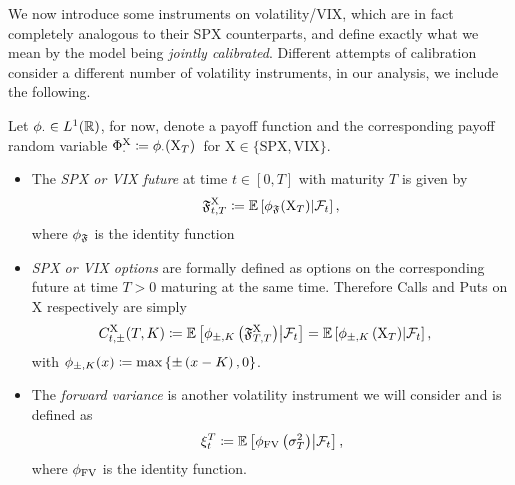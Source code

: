 We now introduce some instruments on volatility/VIX, which are in fact completely analogous to their SPX counterparts, and define exactly what we mean by the model being \textit{jointly calibrated}. Different attempts of calibration consider a different number of volatility instruments, in our analysis, we include the following. 

Let $\phi_\cdot\in L^1(\mathbb{R})$, for now, denote a payoff function and the corresponding payoff random variable $\Phi_{\cdot}^{\mathrm{X}}\coloneqq \phi_{\cdot}(\mathrm{X}_T)\,$ for $\mathrm{X}\in\{\text{SPX}, \text{VIX}\}$. 

\begin{itemize}
\item The \textit{SPX or VIX future} at time $t\in[0,T]$ with maturity $T$ is given by
\begin{equation*}
\mathfrak{F}_{t, T}^{\mathrm{X}}\coloneqq\mathbb{E}\left[\phi_{\mathfrak{F}}(\mathrm{X}_{T}) \middle\vert \mathcal{F}_{t}\right],
\end{equation*}
where $\phi_{\mathfrak{F}}$ is the identity function
\item \textit{SPX or VIX options} are formally defined as options on the corresponding future at time $T>0$ maturing at the same time. Therefore Calls and Puts on $\mathrm{X}$ respectively are simply
\begin{align*}
C_{t,\pm}^{\mathrm{X}}(T,K) &\coloneqq \mathbb{E}\left[\phi_{\pm, K}\left(\mathfrak{F}^{\mathrm{X}}_{T,T}\right) \middle\vert \mathcal{F}_{t}\right] = \mathbb{E}\left[\phi_{\pm, K}\left(\mathrm{X}_{T}\right)\middle\vert \mathcal{F}_{t}\right],
\end{align*}
with $\phi_{\pm, K}(x) \coloneqq \max \left\{ \pm \left(x - K\right), 0 \right\}$.
\item The \textit{forward variance} is another volatility instrument we will consider and is defined as
\begin{equation*}
\xi_{t}^{T} \coloneqq\mathbb{E}\left[\phi_\textup{FV}\left(\sigma^2_T\right) \middle\vert \mathcal{F}_{t}\right],
\end{equation*}
where $\phi_\textup{FV}$ is the identity function.
\end{itemize}


